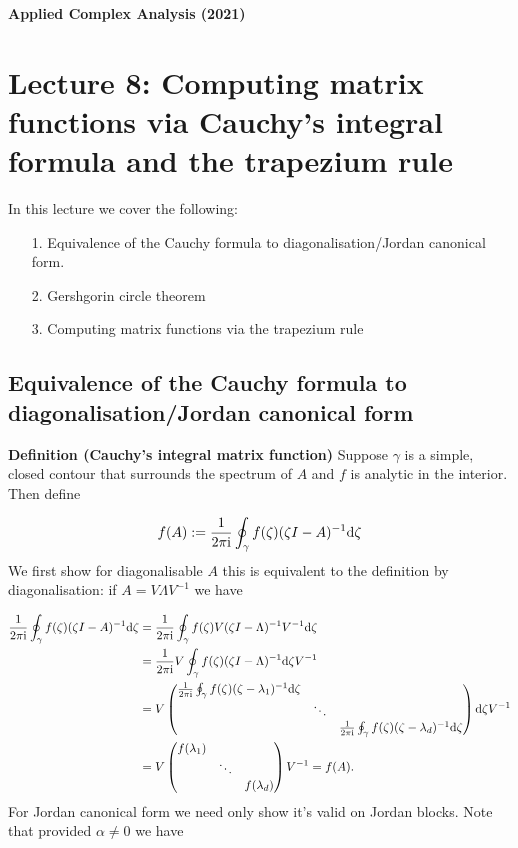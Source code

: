 \documentclass[12pt,a4paper]{article}
\def\D{ {\rm d} }
\def\I{ {\rm i} }
\def\sopmatrix#1{ \begin{pmatrix}#1\end{pmatrix} }
\begin{document}
\textbf{Applied Complex Analysis (2021)}

\section{Lecture 8: Computing matrix  functions via Cauchy's integral formula and the trapezium rule}
In this lecture we cover the following:

\begin{itemize}
\item[1. ] Equivalence of the Cauchy formula to diagonalisation/Jordan canonical form.


\item[2. ] Gershgorin circle theorem


\item[3. ] Computing matrix functions via the trapezium rule

\end{itemize}
\subsection{Equivalence of the Cauchy formula to diagonalisation/Jordan canonical form}
\textbf{Definition (Cauchy's integral  matrix function)} Suppose $\gamma$ is a simple, closed contour that surrounds the spectrum of $A$ and $f$ is analytic in the interior. Then define

\[
f(A) := {1 \over 2 \pi \I} \oint_\gamma f(\zeta)(\zeta I - A)^{-1} \D \zeta
\]
We first show for diagonalisable $A$ this is equivalent to the definition by diagonalisation: if $A = V \Lambda V^{-1}$ we have


\begin{align*}
{1 \over 2 \pi \I} \oint_\gamma f(\zeta)(\zeta I - A)^{-1} \D \zeta &=
{1 \over 2 \pi \I} \oint_\gamma f(\zeta) V (\zeta I - \Lambda)^{-1} V^{-1} \D \zeta \\
&= {1 \over 2 \pi \I}  V \oint_\gamma f(\zeta)  (\zeta I - \Lambda)^{-1}  \D \zeta V^{-1}\\
&=  V \sopmatrix{ {1 \over 2 \pi \I} \oint_\gamma f(\zeta)  (\zeta - \lambda_1)^{-1} \D \zeta\\
&\ddots \\ && {1 \over 2 \pi \I} \oint_\gamma f(\zeta)  (\zeta - \lambda_d)^{-1} \D \zeta }  \D \zeta V^{-1} \\
&= V \sopmatrix{ f(\lambda_1)\\
&\ddots \\ && f(\lambda_d) }   V^{-1}  = f(A).
\end{align*}
For Jordan canonical form we need only show it's valid on Jordan blocks. Note that provided $\alpha \neq 0$ we have
\end{document}
